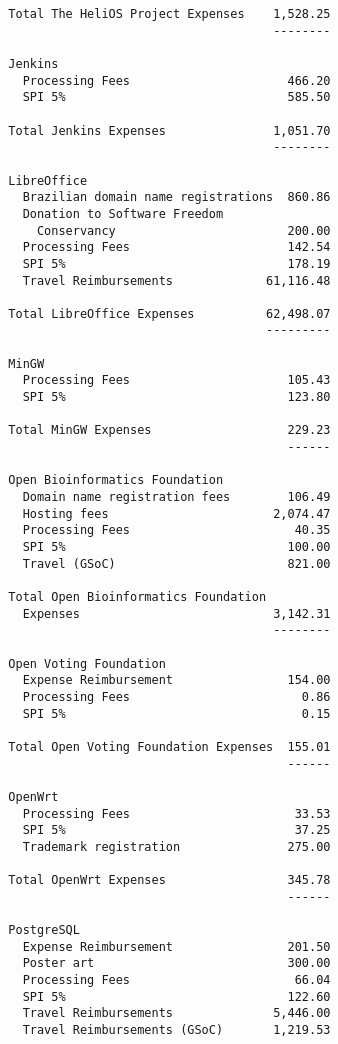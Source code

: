 \documentclass[letterpaper]{report}
\begin{document}
\begin{verbatim}
  Total The HeliOS Project Expenses    1,528.25
                                       --------

  Jenkins
    Processing Fees                      466.20
    SPI 5%                               585.50

  Total Jenkins Expenses               1,051.70
                                       --------

  LibreOffice
    Brazilian domain name registrations  860.86
    Donation to Software Freedom
      Conservancy                        200.00
    Processing Fees                      142.54
    SPI 5%                               178.19
    Travel Reimbursements             61,116.48

  Total LibreOffice Expenses          62,498.07
                                      ---------

  MinGW
    Processing Fees                      105.43
    SPI 5%                               123.80

  Total MinGW Expenses                   229.23
                                         ------

  Open Bioinformatics Foundation
    Domain name registration fees        106.49
    Hosting fees                       2,074.47
    Processing Fees                       40.35
    SPI 5%                               100.00
    Travel (GSoC)                        821.00

  Total Open Bioinformatics Foundation
    Expenses                           3,142.31
                                       --------

  Open Voting Foundation
    Expense Reimbursement                154.00
    Processing Fees                        0.86
    SPI 5%                                 0.15

  Total Open Voting Foundation Expenses  155.01
                                         ------

  OpenWrt
    Processing Fees                       33.53
    SPI 5%                                37.25
    Trademark registration               275.00

  Total OpenWrt Expenses                 345.78
                                         ------

  PostgreSQL
    Expense Reimbursement                201.50
    Poster art                           300.00
    Processing Fees                       66.04
    SPI 5%                               122.60
    Travel Reimbursements              5,446.00
    Travel Reimbursements (GSoC)       1,219.53


\end{verbatim}
\end{document}
